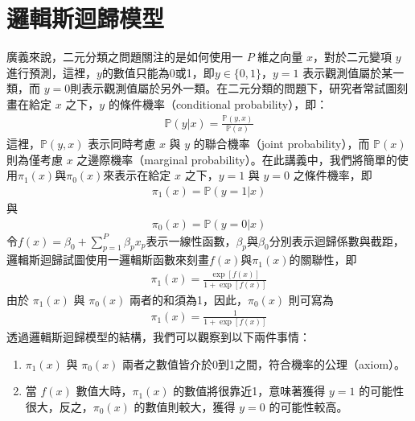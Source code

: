 \documentclass[letterpaper,10pt,english]{sphinxmanual}
\begin{document}
\section{邏輯斯迴歸模型}
\label{\detokenize{notebook/logistic-regression:id2}}
廣義來說，二元分類之問題關注的是如何使用一 \(P\) 維之向量 \(x\)，對於二元變項 \(y\) 進行預測，這裡，\(y\)的數值只能為0或1，即\(y \in \{0,1\}\)，\(y=1\) 表示觀測值屬於某一類，而 \(y=0\)則表示觀測值屬於另外一類。在二元分類的問題下，研究者常試圖刻畫在給定 \(x\) 之下，\(y\) 的條件機率（conditional probability），即：
\begin{equation*}
\begin{split}\mathbb{P}(y|x)=\frac{\mathbb{P}(y,x)}{\mathbb{P}(x)}\end{split}
\end{equation*}
這裡，\(\mathbb{P}(y,x)\) 表示同時考慮 \(x\) 與 \(y\) 的聯合機率（joint probability），而 \(\mathbb{P}(x)\) 則為僅考慮 \(x\) 之邊際機率（marginal probability）。在此講義中，我們將簡單的使用\(\pi_1(x)\)與\(\pi_0(x)\)來表示在給定 \(x\) 之下，\(y=1\) 與 \(y=0\) 之條件機率，即
\begin{equation*}
\begin{split}\pi_1(x) =\mathbb{P}(y=1|x)\end{split}
\end{equation*}
與
\begin{equation*}
\begin{split}\pi_0(x) =\mathbb{P}(y=0|x)\end{split}
\end{equation*}
令\(f(x)=\beta_0 + \sum_{p=1}^P \beta_p x_p\)表示一線性函數，\(\beta_p\)與\(\beta_0\)分別表示迴歸係數與截距，邏輯斯迴歸試圖使用一邏輯斯函數來刻畫\(f(x)\)與\(\pi_1(x)\)的關聯性，即
\begin{equation*}
\begin{split}\pi_1(x) = \frac{\exp{ \left[ f(x) \right] }}{1+\exp{ \left[ f(x) \right] }}\end{split}
\end{equation*}
由於 \(\pi_1(x)\) 與 \(\pi_0(x)\) 兩者的和須為1，因此，\(\pi_0(x)\) 則可寫為
\begin{equation*}
\begin{split}\pi_1(x) = \frac{1}{1+\exp{ \left[ f(x) \right] }}\end{split}
\end{equation*}
透過邏輯斯迴歸模型的結構，我們可以觀察到以下兩件事情：
\begin{enumerate}
%
\item {} 
\(\pi_1(x)\) 與 \(\pi_0(x)\) 兩者之數值皆介於0到1之間，符合機率的公理（axiom）。

\item {} 
當 \(f(x)\) 數值大時，\(\pi_1(x)\) 的數值將很靠近1，意味著獲得 \(y=1\) 的可能性很大，反之，\(\pi_0(x)\) 的數值則較大，獲得 \(y=0\) 的可能性較高。

\end{enumerate}
\end{document}
